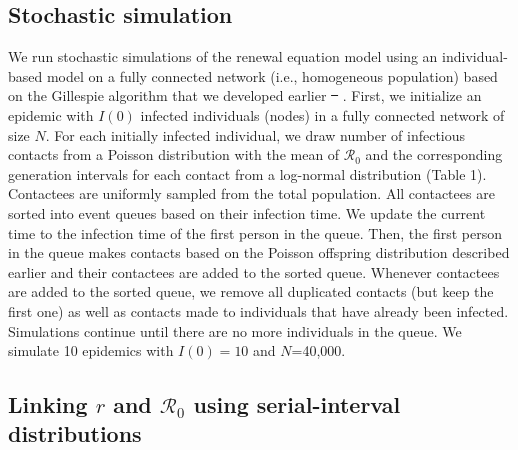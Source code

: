 \documentclass[12pt]{article}
\newcommand{\Rx}[1]{\ensuremath{{\mathcal R}_{#1}}\xspace}
\newcommand{\Ro}{\Rx{0}}
\providecommand{\DIFaddtex}[1]{{\protect\color{blue}\uwave{#1}}} %
\providecommand{\DIFdeltex}[1]{{\protect\color{red}\sout{#1}}}                      %
\providecommand{\DIFaddbegin}{} %
\providecommand{\DIFaddend}{} %
\providecommand{\DIFdelbegin}{} %
\providecommand{\DIFdelend}{} %
\providecommand{\DIFadd}[1]{\texorpdfstring{\DIFaddtex{#1}}{#1}} %
\providecommand{\DIFdel}[1]{\texorpdfstring{\DIFdeltex{#1}}{}} %
\newcommand{\DIFscaledelfig}{0.5}
\newlength{\DIFdelgraphicswidth} %
\newlength{\DIFdelgraphicsheight} %
\newcommand{\DIFaddincludegraphics}[2][]{{\color{blue}\fbox{\DIFOincludegraphics[#1]{#2}}}} %
\newcommand{\DIFdelincludegraphics}[2][]{%
\sbox{\DIFdelgraphicsbox}{\DIFOincludegraphics[#1]{#2}}%
\settoboxwidth{\DIFdelgraphicswidth}{\DIFdelgraphicsbox} %
\settoboxtotalheight{\DIFdelgraphicsheight}{\DIFdelgraphicsbox} %
\scalebox{\DIFscaledelfig}{%
\parbox[b]{\DIFdelgraphicswidth}{\usebox{\DIFdelgraphicsbox}\\[-\baselineskip] \rule{\DIFdelgraphicswidth}{0em}}\llap{\resizebox{\DIFdelgraphicswidth}{\DIFdelgraphicsheight}{%
\setlength{\unitlength}{\DIFdelgraphicswidth}%
\begin{picture}(1,1)%
\thicklines\linethickness{2pt} %
{\color[rgb]{1,0,0}\put(0,0){\framebox(1,1){}}}%
{\color[rgb]{1,0,0}\put(0,0){\line( 1,1){1}}}%
{\color[rgb]{1,0,0}\put(0,1){\line(1,-1){1}}}%
\end{picture}%
}\hspace*{3pt}}} %
} %
\DeclareRobustCommand{\DIFaddbegin}{\DIFOaddbegin \let\includegraphics\DIFaddincludegraphics} %
\DeclareRobustCommand{\DIFaddend}{\DIFOaddend \let\includegraphics\DIFOincludegraphics} %
\DeclareRobustCommand{\DIFdelbegin}{\DIFOdelbegin \let\includegraphics\DIFdelincludegraphics} %
\DeclareRobustCommand{\DIFdelend}{\DIFOaddend \let\includegraphics\DIFOincludegraphics} %
\begin{document}
\subsection{Stochastic simulation}

We run stochastic simulations of the renewal equation model using an individual-based model on a fully connected network (i.e., homogeneous population) based on the Gillespie algorithm that we developed earlier \DIFdelbegin \DIFdel{\mbox{%
\citep{park2019inferring}}\hspace{0pt}%
}\DIFdelend \DIFaddbegin \DIFadd{\mbox{%
\citep{park2020inferring}}\hspace{0pt}%
}\DIFaddend .
First, we initialize an epidemic with $I(0)$ infected individuals (nodes) in a fully connected network of size $N$. 
For each initially infected individual, we draw number of infectious contacts from a Poisson distribution with the mean of \Ro and the corresponding generation intervals for each contact from a log-normal distribution (Table 1).
Contactees are uniformly sampled from the total population.
All contactees are sorted into event queues based on their infection time.
We update the current time to the infection time of the first person in the queue.
Then, the first person in the queue makes contacts based on the Poisson offspring distribution described earlier and their contactees are added to the sorted queue.
Whenever contactees are added to the sorted queue, we remove all duplicated contacts (but keep the first one) as well as contacts made to individuals that have already been infected.
Simulations continue until there are no more individuals in the queue.
We simulate 10 epidemics with $I(0)=10$ and $N$=40,000.

\subsection{Linking $r$ and \Ro using serial-interval distributions}
\end{document}
